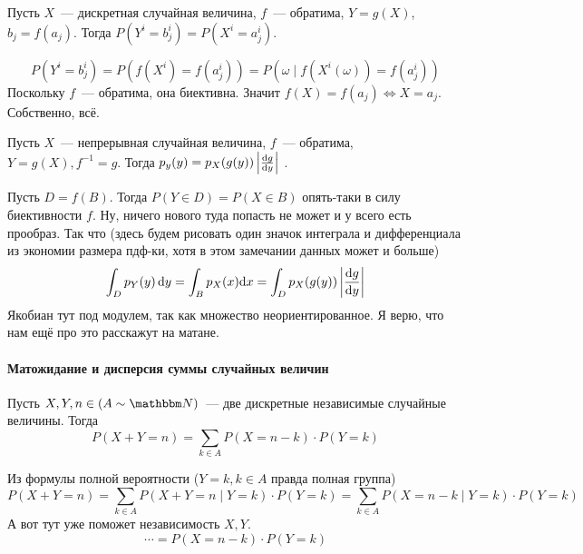 \documentclass[12pt,timbord]{../../../notes}
\begin{document}
\begin{prop}\label{prop:stat::funcrand::disc}
  Пусть $X$~--- дискретная случайная величина, $f$~--- обратима, $Y=g(X)$, $b_j= f(a_j)$.
  Тогда $P(Y^i=b^i_j) =P(X^i=a^i_j)$.
\end{prop}
\begin{itlproof}
  \[
  P(Y^i=b^i_j) = P(f(X^i)= f(a^i_j)) = P({\omega \mid f(X^i(\omega))=f(a^i_j)}) 
  \]
  Поскольку $f$~--- обратима, она биективна. Значит $f(X) = f(a_j) \Leftrightarrow X = a_j$.
  Собственно, всё.
\end{itlproof}
\begin{prop}\label{prop:stat::funcrand::cont}
  Пусть $X$~--- непрерывная случайная величина, $f$~--- обратима, $Y=g(X), f^{-1} = g$.
  Тогда $p_y(y) = p_X(g(y)) \left| \frac{\mathrm{d} g}{\mathrm{d} y} \right|$ .
\end{prop}
\begin{itlproof}
  Пусть $D=f(B)$. Тогда $P(Y \in D) = P(X \in B)$ опять-таки в силу биективности $f$. Ну, ничего
  нового туда попасть не может и у всего есть  прообраз. Так что (здесь будем рисовать один значок
  интеграла и дифференциала из экономии размера пдф-ки, хотя в этом замечании данных может и больше)
  \begin{align*}
    \int_D p_Y(y) \, \mathrm{d} y  = \int_B  p_X(x) \mathrm{d} x 
    = \int_D  p_X(g(y)) \left| \frac{\mathrm{d} g}{\mathrm{d} y} \right|  
  \end{align*}
  Якобиан тут под модулем, так как множество неориентированное. Я верю, что нам ещё про это
  расскажут на матане.
\end{itlproof}

\paragraph{Матожидание и дисперсия суммы случайных величин}
\label{par:stat::randsum}

\begin{prop}\label{prop:stat::randsum::discsum}
  Пусть $X,Y,n\in(A\sim\N)$~--- две дискретные независимые случайные величины. Тогда 
  \[
    P(X+Y=n) = \sum_{k\in A} P(X=n-k)\cdot P(Y=k)
  \]
\end{prop}
\begin{itlproof}
  Из формулы полной вероятности ($Y=k, k\in A$ правда полная группа)
  \[
    P(X+Y =n) = \sum_{k\in A} P(X+Y =n \mid Y =k)\cdot P(Y = k) 
    = \sum_{k\in A} P(X= n-k\mid Y=k)\cdot P(Y=k)
  \]
  А вот тут уже поможет независимость $X,Y$.
  \[
    \cdots = P(X=n-k)\cdot P(Y=k)
  \]
\end{itlproof}
\end{document}
